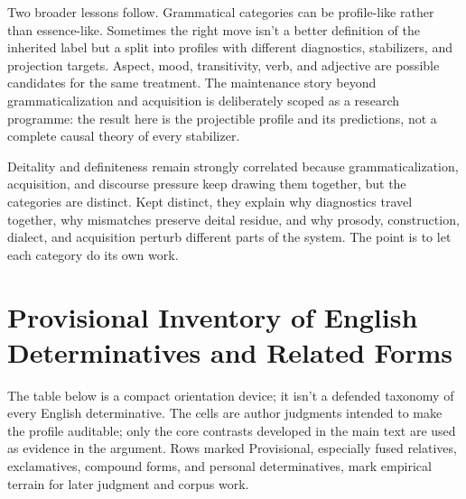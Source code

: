 \documentclass[12pt,letterpaper]{article}
\begin{document}
Two broader lessons follow. Grammatical categories can be profile-like rather than essence-like. Sometimes the right move isn't a better definition of the inherited label but a split into profiles with different diagnostics, stabilizers, and projection targets. Aspect, mood, transitivity, verb, and adjective are possible candidates for the same treatment. The maintenance story beyond grammaticalization and acquisition is deliberately scoped as a research programme: the result here is the projectible profile and its predictions, not a complete causal theory of every stabilizer.

Deitality and definiteness remain strongly correlated because grammaticalization, acquisition, and discourse pressure keep drawing them together, but the categories are distinct. Kept distinct, they explain why diagnostics travel together, why mismatches preserve deital residue, and why prosody, construction, dialect, and acquisition perturb different parts of the system. The point is to let each category do its own work.

\clearpage
\appendix
\section{Provisional Inventory of English Determinatives and Related Forms}\label{sec:inventory}

The table below is a compact orientation device; it isn't a defended taxonomy of every English determinative. The cells are author judgments intended to make the profile auditable; only the core contrasts developed in the main text are used as evidence in the argument. Rows marked Provisional, especially fused relatives, exclamatives, compound forms, and personal determinatives, mark empirical terrain for later judgment and corpus work.
\end{document}
